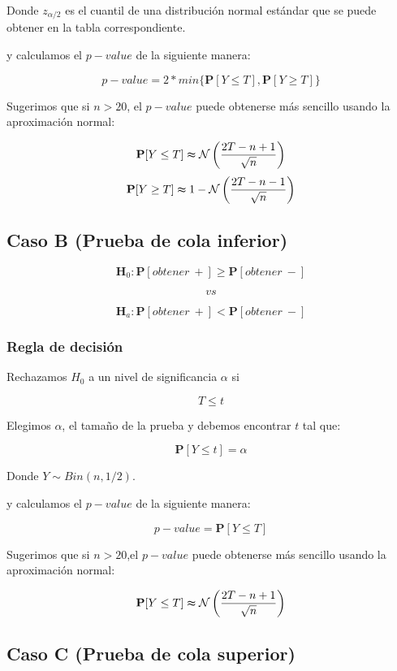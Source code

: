 \documentclass[
  a4paper,
  oneside,
  openany]{book}
\begin{document}
Donde \(z_{\alpha/2}\) es el cuantil de una distribución normal estándar que se puede obtener en la tabla correspondiente.

y calculamos el \(p-value\) de la siguiente manera:

\[p-value=2*min\{\mathbf{P}[Y\leq T],\mathbf{P}[Y\geq T]\}\]

Sugerimos que si \(n > 20\), el \(p-value\) puede obtenerse más sencillo usando la aproximación normal:

\[\mathbf{P}[Y\leq T] \thickapprox  \mathcal{N}\left(\frac{2T-n+1}{\sqrt{n}}\right)\]
\[\mathbf{P}[Y\geq T] \thickapprox 1- \mathcal{N} \left(\frac{2T-n-1}{\sqrt{n}}\right)\]

\hypertarget{caso-b-prueba-de-cola-inferior-2}{%
\subsection*{Caso B (Prueba de cola inferior)}\label{caso-b-prueba-de-cola-inferior-2}}


\[\textbf{H}_0: \mathbf{P}[obtener\ +] \geq \mathbf{P}[obtener\ -]\]

\[vs\]

\[\textbf{H}_a: \mathbf{P}[obtener\ +] < \mathbf{P}[obtener\ -]\]

\hypertarget{regla-de-decisiuxf3n-7}{%
\subsubsection*{Regla de decisión}\label{regla-de-decisiuxf3n-7}}


Rechazamos \(H_0\) a un nivel de significancia \(\alpha\) si

\[T \leq t\]

Elegimos \(\alpha\), el tamaño de la prueba y debemos encontrar \(t\) tal que:

\[\mathbf{P}[Y \leq t]=\alpha\]

Donde \(Y \sim Bin (n,1/2)\).

y calculamos el \(p-value\) de la siguiente manera:

\[p-value=\mathbf{P}[Y\leq T]\]

Sugerimos que si \(n > 20\),el \(p-value\) puede obtenerse más sencillo usando la aproximación normal:

\[\mathbf{P}[Y\leq T] \thickapprox  \mathcal{N} \left(\frac{2T-n+1}{\sqrt{n}}\right)\]

\hypertarget{caso-c-prueba-de-cola-superior-1}{%
\subsection*{Caso C (Prueba de cola superior)}\label{caso-c-prueba-de-cola-superior-1}}
\end{document}
